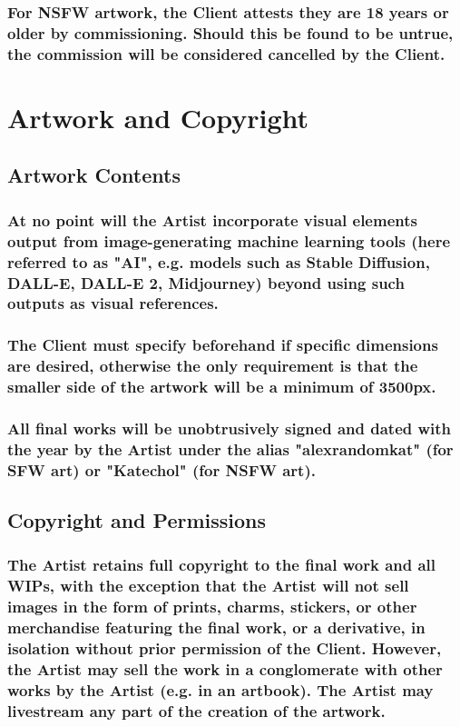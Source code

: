 \documentclass{article}
\begin{document}
\begin{flushleft}
		\subsubsection[Age Restrictions]{\normalfont For NSFW artwork, the Client attests they are 18 years or older by commissioning. Should this be found to be untrue, the commission will be considered cancelled by the Client.}

\leftskip=0cm
\section{Artwork and Copyright}

	\leftskip=1cm
	\subsection{Artwork Contents}

		\leftskip=2cm
		\subsubsection[Artist AI Policy]{\normalfont At no point will the Artist incorporate visual elements output from  image-generating machine learning tools (here referred to as "AI", e.g. models such as Stable Diffusion, DALL-E, DALL-E 2, Midjourney) beyond using such outputs as visual references.}

		\subsubsection[Artwork Dimensions]{\normalfont The Client must specify beforehand if specific dimensions are desired, otherwise the only requirement is that the smaller side of the artwork will be a minimum of 3500px.}

		\subsubsection[Signatures]{\normalfont All final works will be unobtrusively signed and dated with the year by the Artist under the alias "alexrandomkat" (for SFW art) or "Katechol" (for NSFW art).}
	\leftskip=1cm
	\subsection{Copyright and Permissions}
	
		\leftskip=2cm
		\subsubsection[Artist Copyright]{\normalfont The Artist retains full copyright to the final work and all WIPs, with the exception that the Artist will not sell images in the form of prints, charms, stickers, or other merchandise featuring the final work, or a derivative, in isolation without prior permission of the Client. However, the Artist may sell the work in a conglomerate with other works by the Artist (e.g. in an artbook). The Artist may livestream any part of the creation of the artwork.}
		

\end{flushleft}
\end{document}
